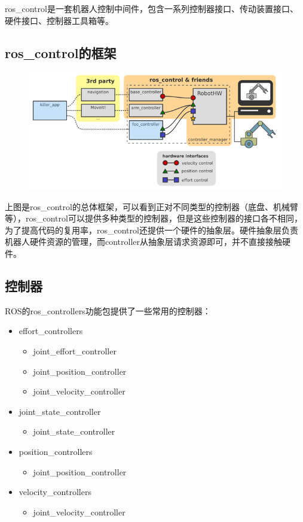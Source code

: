 \documentclass[10pt, oneside]{book}
\begin{document}
ros\_control是一套机器人控制中间件，包含一系列控制器接口、传动装置接口、硬件接口、控制器工具箱等。

\subsection{ros\_control的框架}

\begin{figure}[H]
    \centering
    \includegraphics[width=0.8\linewidth]{image/ros_control.png}
\end{figure}

上图是ros\_control的总体框架，可以看到正对不同类型的控制器（底盘、机械臂等），ros\_control可以提供多种类型的控制器，但是这些控制器的接口各不相同，为了提高代码的复用率，ros\_control还提供一个硬件的抽象层。硬件抽象层负责机器人硬件资源的管理，而controller从抽象层请求资源即可，并不直接接触硬件。

\subsection{控制器}

ROS的ros\_controllers功能包提供了一些常用的控制器：

\begin{itemize}
    \item effort\_controllers
        \begin{itemize}
            \item joint\_effort\_controller
            \item joint\_position\_controller
            \item joint\_velocity\_controller
        \end{itemize}
    \item joint\_state\_controller
        \begin{itemize}
            \item joint\_state\_controller
        \end{itemize}
    \item position\_controllers
        \begin{itemize}
            \item joint\_position\_controller
        \end{itemize}
    \item velocity\_controllers
        \begin{itemize}
            \item joint\_velocity\_controller
        \end{itemize}
\end{itemize}
\end{document}
